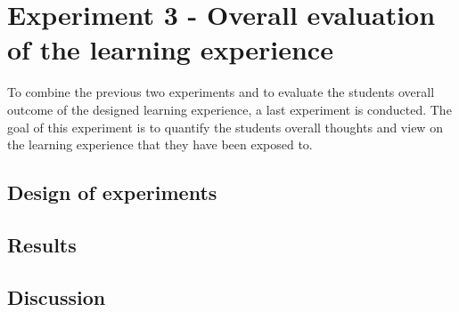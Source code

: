 \chapter{Experiment 3 - Overall evaluation of the learning experience}
\label{chapter_experiment3_overall_learning_experience}
To combine the previous two experiments and to evaluate the students overall outcome of the designed learning experience, a last experiment is conducted. The goal of this experiment is to quantify the students overall thoughts and view on the learning experience that they have been exposed to. \\

\section{Design of experiments}



\section{Results}

\section{Discussion}



